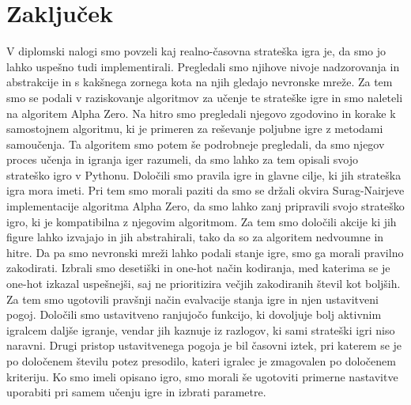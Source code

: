 \documentclass[a4paper, 12pt]{book}
\begin{document}

\chapter{Zaključek}
\label{chzakljucek}
V diplomski nalogi smo povzeli kaj realno-časovna strateška igra je, da smo jo lahko uspešno tudi implementirali.
Pregledali smo njihove nivoje nadzorovanja in abstrakcije in s kakšnega zornega kota na njih gledajo nevronske mreže.
Za tem smo se podali v raziskovanje algoritmov za učenje te strateške igre in smo naleteli na algoritem Alpha Zero.
Na hitro smo pregledali njegovo zgodovino in korake k samostojnem algoritmu, ki je primeren za reševanje poljubne igre z metodami samoučenja.
Ta algoritem smo potem še podrobneje pregledali, da smo njegov proces učenja in igranja iger razumeli, da smo lahko za tem opisali svojo strateško igro v Pythonu.
Določili smo pravila igre in glavne cilje, ki jih strateška igra mora imeti.
Pri tem smo morali paziti da smo se držali okvira Surag-Nairjeve implementacije algoritma Alpha Zero, da smo lahko zanj pripravili svojo strateško igro, ki je kompatibilna z njegovim algoritmom.
Za tem smo določili akcije ki jih figure lahko izvajajo in jih abstrahirali, tako da so za algoritem nedvoumne in hitre.
Da pa smo nevronski mreži lahko podali stanje igre, smo ga morali pravilno zakodirati.
Izbrali smo desetiški in one-hot način kodiranja, med katerima se je one-hot izkazal uspešnejši, saj ne prioritizira večjih zakodiranih števil kot boljših.
Za tem smo ugotovili pravšnji način evalvacije stanja igre in njen ustavitveni pogoj.
Določili smo ustavitveno ranjujočo funkcijo, ki dovoljuje bolj aktivnim igralcem daljše igranje, vendar jih kaznuje iz razlogov, ki sami strateški igri niso naravni.
Drugi pristop ustavitvenega pogoja je bil časovni iztek, pri katerem se je po določenem številu potez presodilo, kateri igralec je zmagovalen po določenem kriteriju.
Ko smo imeli opisano igro, smo morali še ugotoviti primerne nastavitve uporabiti pri samem učenju igre in izbrati parametre.
\end{document}
